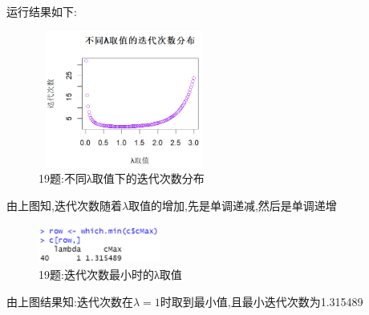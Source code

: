 \documentclass{book}
\begin{document}
运行结果如下:
\begin{figure}[H]
  \centering
  \includegraphics*[height = 4.5cm, width = 5.7cm]{gramFile/第十九题/不同λ取值下的迭代次数分布.PNG}
  \caption{19题:不同λ取值下的迭代次数分布}
\end{figure}
\noindent
由上图知,迭代次数随着$\lambda$取值的增加,先是单调递减,然后是单调递增
\begin{figure}[H]
  \centering
  \includegraphics*[height = 1.28cm, width = 4cm]{gramFile/第十九题/迭代次数最小时的λ取值.PNG}
  \caption{19题:迭代次数最小时的λ取值}
\end{figure}
\noindent
由上图结果知:迭代次数在$\lambda=1$时取到最小值,且最小迭代次数为1.315489

\hspace*{\fill} \\
\end{document}
